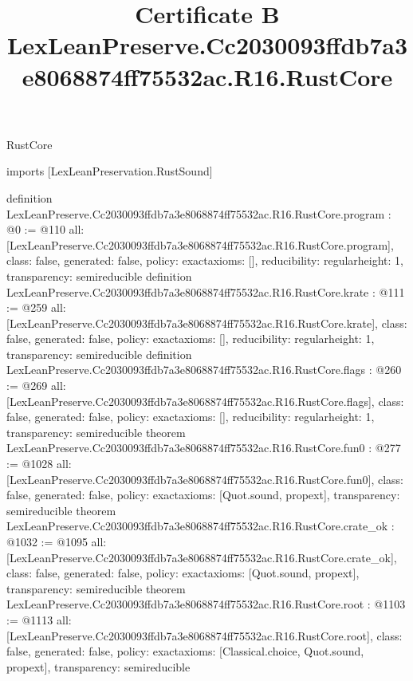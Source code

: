 \begin{lexlean}{RustCore}
\title{Certificate B LexLeanPreserve.Cc2030093ffdb7a3e8068874ff75532ac.R16.RustCore}
\begin{coremodule}
imports [LexLeanPreservation.RustSound]

definition LexLeanPreserve.Cc2030093ffdb7a3e8068874ff75532ac.R16.RustCore.program : @0 := @110 {
  all: [LexLeanPreserve.Cc2030093ffdb7a3e8068874ff75532ac.R16.RustCore.program],
  class: false,
  generated: false,
  policy: exact{axioms: []},
  reducibility: regular{height: 1},
  transparency: semireducible
}
definition LexLeanPreserve.Cc2030093ffdb7a3e8068874ff75532ac.R16.RustCore.krate : @111 := @259 {
  all: [LexLeanPreserve.Cc2030093ffdb7a3e8068874ff75532ac.R16.RustCore.krate],
  class: false,
  generated: false,
  policy: exact{axioms: []},
  reducibility: regular{height: 1},
  transparency: semireducible
}
definition LexLeanPreserve.Cc2030093ffdb7a3e8068874ff75532ac.R16.RustCore.flags : @260 := @269 {
  all: [LexLeanPreserve.Cc2030093ffdb7a3e8068874ff75532ac.R16.RustCore.flags],
  class: false,
  generated: false,
  policy: exact{axioms: []},
  reducibility: regular{height: 1},
  transparency: semireducible
}
theorem LexLeanPreserve.Cc2030093ffdb7a3e8068874ff75532ac.R16.RustCore.fun0 : @277 := @1028 {
  all: [LexLeanPreserve.Cc2030093ffdb7a3e8068874ff75532ac.R16.RustCore.fun0],
  class: false,
  generated: false,
  policy: exact{axioms: [Quot.sound, propext]},
  transparency: semireducible
}
theorem LexLeanPreserve.Cc2030093ffdb7a3e8068874ff75532ac.R16.RustCore.crate_ok : @1032 := @1095 {
  all: [LexLeanPreserve.Cc2030093ffdb7a3e8068874ff75532ac.R16.RustCore.crate_ok],
  class: false,
  generated: false,
  policy: exact{axioms: [Quot.sound, propext]},
  transparency: semireducible
}
theorem LexLeanPreserve.Cc2030093ffdb7a3e8068874ff75532ac.R16.RustCore.root : @1103 := @1113 {
  all: [LexLeanPreserve.Cc2030093ffdb7a3e8068874ff75532ac.R16.RustCore.root],
  class: false,
  generated: false,
  policy: exact{axioms: [Classical.choice, Quot.sound, propext]},
  transparency: semireducible
}


\end{coremodule}
\end{lexlean}
